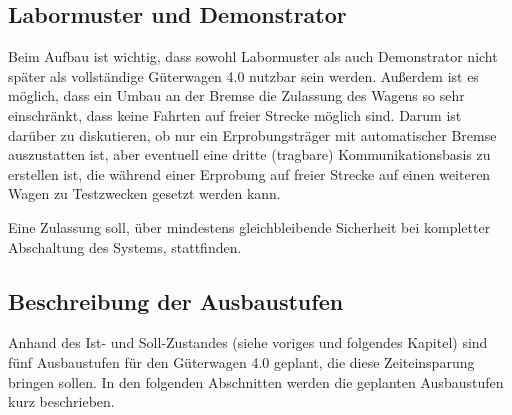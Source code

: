 \subsection{Labormuster und Demonstrator}
Beim Aufbau ist wichtig, dass sowohl Labormuster als auch Demonstrator nicht später als vollständige Güterwagen 4.0 nutzbar sein werden. Außerdem ist es möglich, dass ein Umbau an der Bremse die Zulassung des Wagens so sehr einschränkt, dass keine Fahrten auf freier Strecke möglich sind. Darum ist darüber zu diskutieren, ob nur ein Erprobungsträger mit automatischer Bremse auszustatten ist, aber eventuell eine dritte (tragbare) Kommunikationsbasis zu erstellen ist, die während einer Erprobung auf freier Strecke auf einen weiteren Wagen zu Testzwecken gesetzt werden kann.\par
Eine Zulassung soll, über mindestens gleichbleibende Sicherheit bei kompletter Abschaltung des Systems, stattfinden. %

\subsection{Beschreibung der Ausbaustufen}\label{sec:Ausbaustufen}
Anhand des Ist- und Soll-Zustandes (siehe voriges und folgendes Kapitel) sind fünf Ausbaustufen für den Güterwagen 4.0 geplant, die diese Zeiteinsparung bringen sollen. In den folgenden Abschnitten werden die geplanten Ausbaustufen kurz beschrieben.\par

